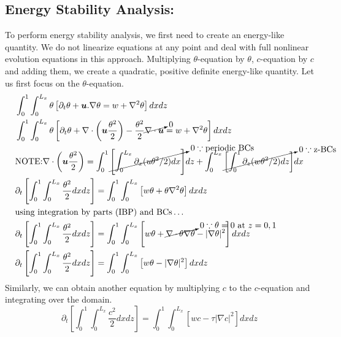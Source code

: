 \documentclass{article}
\newcommand{\grad}[1]{\nabla{#1}}
\newcommand{\deldot}[1]{\nabla \cdot{#1}}
\newcommand{\lap}[1]{\nabla^{2}{#1}}
\newcommand{\bsym}[1]{\boldsymbol{#1}}
\begin{document}
\subsection{Energy Stability Analysis:}
To perform energy stability analysis, we first need to create an energy-like quantity. We do not linearize equations at any point and deal with full nonlinear evolution equations in this approach. Multiplying $\theta$-equation by $\theta$, $c$-equation by $c$ and adding them, we create a quadratic, positive definite energy-like quantity. Let us first focus on the $\theta$-equation.
\begin{align}
 \begin{split}
  & \int_{0}^{1} \int_{0}^{L_{x}}\theta \left[\partial_{t}\theta + \bsym{u}.\grad{\theta} = w + \lap{\theta}\right] dx dz \\
  &\int_{0}^{1} \int_{0}^{L_{x}}\theta \left[\partial_{t}\theta + \deldot{\left(\bsym{u} \frac{\theta^{2}}{2}\right)}- \frac{\theta^{2}}{2}\cancelto{0}{\deldot{\bsym{u}}} = w + \lap{\theta}\right] dx dz \\
  &\textrm{NOTE:} \deldot{\left(\bsym{u} \frac{\theta^{2}}{2}\right)} = \int_{0}^{1}\cancelto{0 \because \textrm{periodic BCs} }{\left[\int_{0}^{L_{x}} \partial_{x}(u\theta^{2}/2) dx\right]}dz + \int_{0}^{L_{x}}\cancelto{0 \because \textrm{z-BCs}}{\left[\int_{0}^{1} \partial_{z}(w\theta^{2}/2) dz \right]}dx\\
  & \partial_{t}\left[\int_{0}^{1} \int_{0}^{L_{x}} \frac{\theta^{2}}{2} dx dz\right] = \int_{0}^{1} \int_{0}^{L_{x}}\left[w\theta  + \theta \lap{\theta} \right] dx dz\\
  &\textrm{using integration by parts (IBP) and BCs} \hdots\\
  &\partial_{t}\left[\int_{0}^{1} \int_{0}^{L_{x}} \frac{\theta^{2}}{2} dx dz\right] = \int_{0}^{1} \int_{0}^{L_{x}}\left[w\theta  + \cancelto{0 \because \theta = 0 \textrm{ at } z=0, 1}{\deldot{\theta \grad{\theta}}} - |\grad{\theta}|^{2} \right]dx dz\\
  &\partial_{t}\left[\int_{0}^{1} \int_{0}^{L_{x}} \frac{\theta^{2}}{2} dx dz\right] = \int_{0}^{1} \int_{0}^{L_{x}}\left[w\theta  - |\grad{\theta}|^{2} \right]dx dz\\
 \end{split}
\end{align}
Similarly, we can obtain another equation by multiplying $c$ to the $c$-equation and integrating over the domain. 
\begin{equation}
 \partial_{t}\left[\int_{0}^{1} \int_{0}^{L_{x}} \frac{c^{2}}{2} dx dz\right] = \int_{0}^{1} \int_{0}^{L_{x}}\left[wc  - \tau |\grad{c}|^{2} \right]dx dz
\end{equation}
\end{document}
